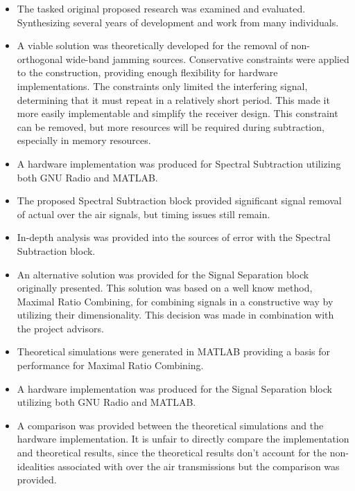 \begin{itemize}

\item The tasked original proposed research was examined and evaluated. Synthesizing several years of development and work from many individuals.

\item A viable solution was theoretically developed for the removal of non-orthogonal wide-band jamming sources.  Conservative constraints were applied to the construction, providing enough flexibility for hardware implementations.  The constraints only limited the interfering signal, determining that it must repeat in a relatively short period.  This made it more easily implementable and simplify the receiver design.  This constraint can be removed, but more resources will be required during subtraction, especially in memory resources.

\item A hardware implementation was produced for Spectral Subtraction utilizing both GNU Radio and MATLAB.

\item The proposed Spectral Subtraction block provided significant signal removal of actual over the air signals, but timing issues still remain.

\item In-depth analysis was provided into the sources of error with the Spectral Subtraction block.

\item An alternative solution was provided for the Signal Separation block originally presented.  This solution was based on a well know method, Maximal Ratio Combining, for combining signals in a constructive way by utilizing their dimensionality.  This decision was made in combination with the project advisors.

\item Theoretical simulations were generated in MATLAB providing a basis for performance for Maximal Ratio Combining.

\item A hardware implementation was produced for the Signal Separation block utilizing both GNU Radio and MATLAB.

\item A comparison was provided between the theoretical simulations and the hardware implementation.  It is unfair to directly compare the implementation and theoretical results, since the theoretical results don't account for the non-idealities associated with over the air transmissions but the comparison was provided. 

\end{itemize}

